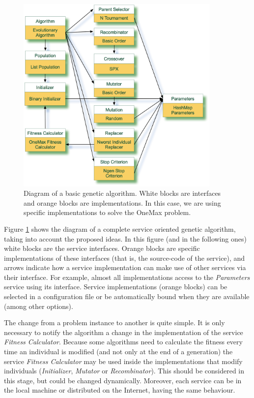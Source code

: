 \begin{figure}
\centering
\includegraphics[width=10cm]{gfx/soaea/basicga.jpg}
\caption{Diagram of a basic genetic algorithm. White blocks are interfaces and orange blocks are implementations. In this case, we are using specific implementations to solve the OneMax problem.}
\label{BASICGAEXAMPLE}
\end{figure}





Figure \ref{BASICGAEXAMPLE} shows the diagram of a complete service oriented genetic algorithm, taking into account the proposed ideas. In this figure (and in the following ones) white blocks are the service interfaces. Orange blocks are specific implementations of these interfaces (that is, the source-code of the service), and  arrows indicate how a service implementation can make use of other services via their interface. For example, almost all implementations access to the {\em Parameters} service using its interface. Service implementations (orange blocks) can be selected in a configuration file or be automatically bound when they are available (among other options).



 The change from a problem instance to another is quite simple. It is only necessary to notify the algorithm a change in the implementation of the service {\em Fitness Calculator}. Because some algorithms need to calculate the fitness every time an individual is modified (and not only at the end of a generation) the service {\em Fitness Calculator} may be used inside the implementations that modify individuals ({\em Initializer}, {\em Mutator} or {\em Recombinator}). This should be considered in this stage, but could be changed dynamically. Moreover, each service can be in the local machine or distributed on the Internet, having the same behaviour.  %

